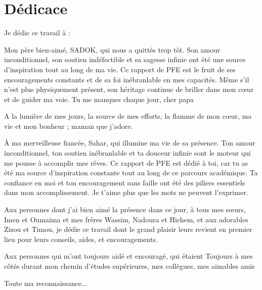\chapter*{\Huge Dédicace}
\vspace{8mm}
\vspace{8mm}

\begingroup
\vspace{20mm}
    \large \raggedright Je dédie ce travail à :
    \vspace{10mm}
    
    Mon père bien-aimé, SADOK, qui nous a quittés trop tôt. Son amour inconditionnel, son soutien indéfectible et sa sagesse infinie ont été une source d'inspiration tout au long de ma vie. Ce rapport de PFE est le fruit de ses encouragements constants et de sa foi inébranlable en mes capacités. Même s'il n'est plus physiquement présent, son héritage continue de briller dans mon cœur et de guider ma voie. Tu me manques chaque jour, cher papa

    A la lumière de mes jours, la source de mes efforts, la flamme de mon cœur, ma vie et mon bonheur ; maman que j’adore.

    À ma merveilleuse fiancée, Sahar, qui illumine ma vie de sa présence. Ton amour inconditionnel, ton soutien inébranlable et ta douceur infinie sont le moteur qui me pousse à accomplir mes rêves. Ce rapport de PFE est dédié à toi, car tu as été ma source d'inspiration constante tout au long de ce parcours académique. Ta confiance en moi et ton encouragement sans faille ont été des piliers essentiels dans mon accomplissement. Je t'aime plus que les mots ne peuvent l'exprimer.
    
    Aux personnes dont j’ai bien aimé la présence dans ce jour, à tous mes sœurs, Imen et Oumaima et mes frères Wassim, Nadoura et Hichem, et aux adorables Zizou et Timou, je dédie ce travail dont le grand plaisir leurs revient en premier lieu pour leurs conseils, aides, et encouragements.
        
    Aux personnes qui m’ont toujours aidé et encouragé, qui étaient
    Toujours à mes côtés durant mon chemin d’études supérieures, mes collègues, mes aimables amis
    
    
  
\endgroup

\begin{flushright}
    \LARGE Toute ma reconnaissance...
\end{flushright}